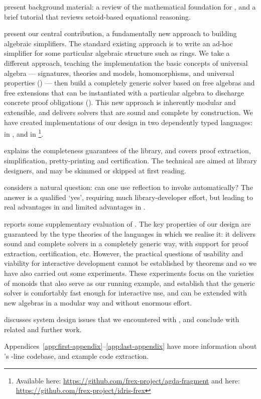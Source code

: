  present background material: a
review of the mathematical foundation for \Frexlib{},
and a brief \idris{} tutorial that reviews
setoid-based equational reasoning.

 present our central contribution, a
fundamentally new approach to building algebraic simplifiers.
%
The standard existing approach is to write an ad-hoc simplifier for
some particular algebraic structure such as rings.
We take a different approach, teaching the implementation the basic concepts of
universal algebra --- signatures, theories and models, homomorphisms,
and universal properties () --- then build a
completely generic solver based on free algebras and free extensions
that can be instantiated with a particular algebra to discharge
concrete proof obligations ().  This new approach is
inherently modular and extensible, and delivers solvers that are sound
and complete by construction.  We have created implementations of our design in
two dependently typed languages: \Fragmentlib{} in \agda{},
and \Frexlib{}
in \idris{}\footnote{
{Available here:
  \url{https://github.com/frex-project/agda-fragment}
and here:
  \url{https://github.com/frex-project/idris-frex}}}.

 explains the completeness guarantees of the
library, and covers proof extraction, simplification, pretty-printing
and certification. The technical 
are aimed at library designers, and may be skimmed or skipped at
first reading.

 considers a natural question: can one use
reflection to invoke \Frexlib{} automatically? The answer is a
qualified `yes', requiring much library-developer effort, but leading
to real advantages in \agda{} and limited advantages in \idris{}.

 reports some supplementary evaluation of
\Frexlib{}.  The key properties of our design are guaranteed by the
type theories of the languages in which we realise it: it delivers
sound and complete solvers in a completely generic way, with support
for proof extraction, certification, etc.  However, the practical
questions of usability and viability for interactive development
cannot be established by theorems and so we have also carried out some
experiments.  These experiments focus on the varieties of monoids that
also serve as our running example, and establish that the generic
solver is comfortably fast enough for interactive use, and can be
extended with new algebras in a modular way and without enormous
effort.

 discusses system design issues that we encountered
with \Frexlib{}, and  conclude with
related and further work.

Appendices~\ref{app:first-appendix}--\ref{app:last-appendix}
have more information about \Frexlib's
\FrexlibLoC{}-line \idris{} codebase, and example code extraction.

